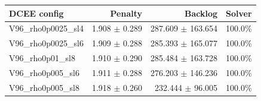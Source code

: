 \begin{tabular}{lrrr}
\toprule
DCEE config & Penalty & Backlog & Solver \\
\midrule
V96_rho0p0025_sl4 & 1.908 $\pm$ 0.289 & 287.609 $\pm$ 163.654 & 100.0\% \\
V96_rho0p0025_sl6 & 1.909 $\pm$ 0.288 & 285.393 $\pm$ 165.077 & 100.0\% \\
V96_rho0p01_sl8 & 1.910 $\pm$ 0.290 & 285.484 $\pm$ 163.728 & 100.0\% \\
V96_rho0p005_sl6 & 1.911 $\pm$ 0.288 & 276.203 $\pm$ 146.236 & 100.0\% \\
V96_rho0p005_sl8 & 1.918 $\pm$ 0.260 & 232.444 $\pm$ 96.005 & 100.0\% \\
\bottomrule
\end{tabular}
